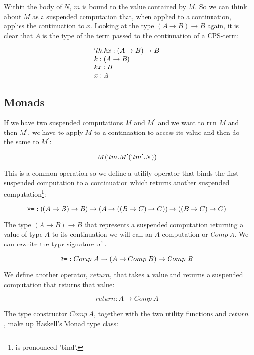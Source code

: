   Within the body of $N$, $m$ is bound to the value contained by $M$.
  So we can think about $M$ as a suspended computation that, when applied
  to a continuation, applies the continuation to $x$. Looking at
  the type $(A \to B) \to B$ again, it is clear that $A$ is the type
  of the term passed to the continuation of a CPS-term:
  
  \[
  \begin{array}{l}
    `lk.kx : (A \to B) \to B \\
    k : (A \to B) \\
    kx : B \\
    x : A \\
  \end{array} 
  \]
  
 
  \subsection{Monads}
  
  If we have two suspended computations $M$ and $M^\prime$ and we want to
  run $M$ and then $M^\prime$, we have to apply $M$ to a continuation
  to access its value and then do the same to $M^\prime$:
  
  \[
    M(`lm.M^\prime(`lm^\prime.N))
  \]
  
  This is a common operation so we define a utility operator \mono{>>=}
  that binds the first suspended computation to a continuation which 
  returns another suspended computation\footnote{ \mono{(>>=)} is pronounced 'bind'.}:
 
  \[
    \texttt{>>=} : ((A \to B) \to B) \to (A \to ((B \to C) \to C)) \to ((B \to C) \to C)
  \]
 
  The type $(A \to B) \to B$ that represents a suspended computation returning
  a value of type $A$ to its continuation we will call an $A$-computation or
  $Comp\ A$. We can rewrite the type signature of \mono{>>=}:
  
  \[
    \texttt{>>=} : Comp\ A \to (A \to Comp\ B) \to Comp\ B
  \]
  
  We define another operator, $return$, that takes a value and returns a 
  suspended computation that returns that value:
  
  \[
    return : A \to Comp\ A 
  \]
 
  The type constructor $Comp\ A$, together with the two utility functions
  \mono{>>=} and $return$, make up Haskell's Monad type class:
  
